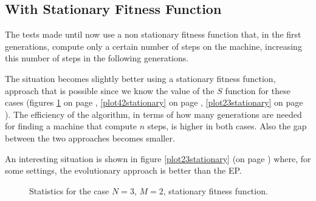 \documentclass{report}
\begin{document}
\subsection*{With Stationary Fitness Function}
The tests made until now use a non stationary fitness function that, in the first generations, compute only a certain number of steps on the machine, increasing this number of steps in the following generations.

The situation becomes slightly better using a stationary fitness function, approach that is possible since we know the value of the $S$ function for these cases (figures \ref{plot32stationary} on page \pageref{plot32stationary}, \ref{plot42stationary} on page \pageref{plot42stationary}, \ref{plot23stationary} on page \pageref{plot23stationary}). The efficiency of the algorithm, in terms of how many generations are needed for finding a machine that compute $n$ steps, is higher in both cases. Also the gap between the two approaches becomes smaller.

An interesting situation is shown in figure \ref{plot23stationary} (on page \pageref{plot23stationary}) where, for some settings, the evolutionary approach is better than the EP.

\begin{figure}[h]
\centering
{}
\caption[]{Statistics for the case $N=3$, $M=2$, stationary fitness function.}
\label{plot32stationary}
\end{figure}
\end{document}
